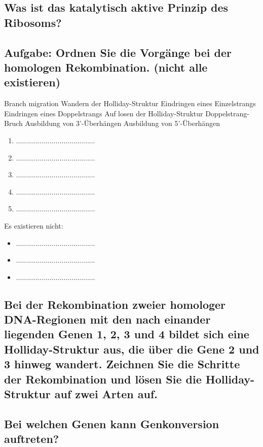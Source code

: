 \documentclass{article}
\begin{document}
\subsection*{Was ist das katalytisch aktive Prinzip des Ribosoms?}
\bigskip\bigskip\bigskip\bigskip

\subsection*{Aufgabe: Ordnen Sie die Vorgänge bei der homologen Rekombination. (nicht alle existieren)}
Branch migration Wandern der Holliday-Struktur Eindringen eines Einzelstrangs
Eindringen eines Doppelstrangs Auf losen der Holliday-Struktur Doppelstrang-Bruch
Ausbildung von 3'-Überhängen Ausbildung von 5'-Überhängen
\begin{enumerate}
    \item ........................................
    \item ........................................
    \item........................................
    \item ........................................
    \item ........................................
\end{enumerate}
Es existieren nicht: 
\begin{itemize}
    \item ........................................
    \item ........................................
    \item ........................................
\end{itemize}

\subsection*{Bei der Rekombination zweier homologer DNA-Regionen mit den nach einander liegenden Genen 1, 2, 3 und 4 bildet sich eine Holliday-Struktur aus, die über die Gene 2 und 3 hinweg wandert. Zeichnen Sie die Schritte der Rekombination und lösen Sie die Holliday-Struktur auf zwei Arten auf.} 
\bigskip\bigskip\bigskip\bigskip\bigskip\bigskip\bigskip\bigskip\bigskip\bigskip\bigskip\bigskip\bigskip\bigskip\bigskip\bigskip\bigskip\bigskip\bigskip\bigskip\bigskip\bigskip\bigskip\bigskip

\subsection*{Bei welchen Genen kann Genkonversion auftreten?}
\bigskip\bigskip\bigskip\bigskip
\end{document}
